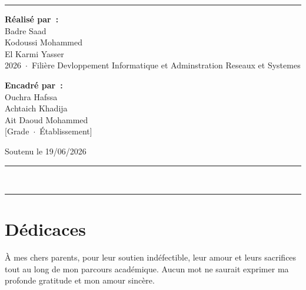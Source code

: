\documentclass[12pt,a4paper]{report}
\begin{document}
\begin{titlepage}
  \vspace{0.7cm}

  
  \noindent\textcolor{vitaBlue}{\rule{\linewidth}{1.5pt}}

  \vfill

  \begin{minipage}{0.46\linewidth}
    \flushleft
    \textbf{Réalisé par~:}\\[6pt]
    {\large Badre Saad}\\[3pt]
    {\large Kodoussi Mohammed}\\[3pt]
    {\large El Karmi Yasser}\\[3pt]
    \small 2026~$\cdot$~Filière Devloppement Informatique et Adminstration Reseaux et Systemes
  \end{minipage}\hfill
  \begin{minipage}{0.46\linewidth}
    \flushright
    \textbf{Encadré par~:}\\[6pt]
    {\large Ouchra Hafssa}\\[3pt]
    {\large Achtaich Khadija}\\[3pt]
    {\large Ait Daoud Mohammed}\\[3pt]
    \small [Grade~$\cdot$~Établissement]
  \end{minipage}

  \vspace{0.9cm}
  {\small\color{gray} Soutenu le 19/06/2026}

  \vspace{0.5cm}

  \noindent\textcolor{vitaGreen}{\rule{\linewidth}{2pt}}\\[-2pt]
  \noindent\textcolor{vitaBlue}{\rule{\linewidth}{4pt}}

\end{titlepage}

\setcounter{page}{2}

\chapter*{Dédicaces}

À mes chers parents, pour leur soutien indéfectible, leur amour et leurs sacrifices
tout au long de mon parcours académique. Aucun mot ne saurait exprimer ma profonde
gratitude et mon amour sincère.
\end{document}
